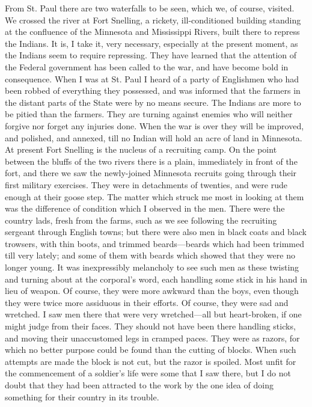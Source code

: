From St. Paul there are two waterfalls to be seen, which we, of
course, visited.  We crossed the river at Fort Snelling, a rickety,
ill-conditioned building standing at the confluence of the
Minnesota and Mississippi Rivers, built there to repress the
Indians.  It is, I take it, very necessary, especially at the
present moment, as the Indians seem to require repressing.  They
have learned that the attention of the Federal government has been
called to the war, and have become bold in consequence.  When I was
at St. Paul I heard of a party of Englishmen who had been robbed of
everything they possessed, and was informed that the farmers in the
distant parts of the State were by no means secure.  The Indians
are more to be pitied than the farmers.  They are turning against
enemies who will neither forgive nor forget any injuries done.
When the war is over they will be improved, and polished, and
annexed, till no Indian will hold an acre of land in Minnesota.  At
present Fort Snelling is the nucleus of a recruiting camp.  On the
point between the bluffs of the two rivers there is a plain,
immediately in front of the fort, and there we saw the newly-joined
Minnesota recruits going through their first military exercises.
They were in detachments of twenties, and were rude enough at their
goose step.  The matter which struck me most in looking at them was
the difference of condition which I observed in the men.  There
were the country lads, fresh from the farms, such as we see
following the recruiting sergeant through English towns; but there
were also men in black coats and black trowsers, with thin boots,
and trimmed beards---beards which had been trimmed till very lately;
and some of them with beards which showed that they were no longer
young.  It was inexpressibly melancholy to see such men as these
twisting and turning about at the corporal's word, each handling
some stick in his hand in lieu of weapon.  Of course, they were
more awkward than the boys, even though they were twice more
assiduous in their efforts.  Of course, they were sad and wretched.
I saw men there that were very wretched---all but heart-broken, if
one might judge from their faces.  They should not have been there
handling sticks, and moving their unaccustomed legs in cramped
paces.  They were as razors, for which no better purpose could be
found than the cutting of blocks.  When such attempts are made the
block is not cut, but the razor is spoiled.  Most unfit for the
commencement of a soldier's life were some that I saw there, but I
do not doubt that they had been attracted to the work by the one
idea of doing something for their country in its trouble.

